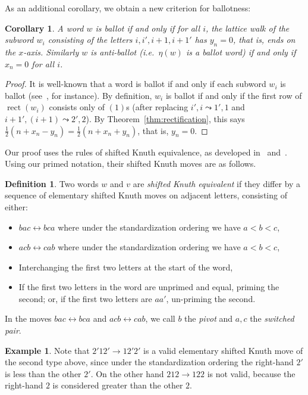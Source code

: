 \documentclass[10pt]{amsart}
\newtheorem{coro}[theorem]{Corollary}
\theoremstyle{definition}
\newtheorem{defi}[theorem]{Definition}
\newtheorem{exam}[theorem]{Example}
\providecommand{\ie}{i.e.\ }
\DeclareMathOperator{\rectify}{rect}
\begin{document}
As an additional corollary, we obtain a new criterion for ballotness:

\begin{coro} \label{cor:ballot-walk-criterion}
A word $w$ is ballot if and only if for all $i$, the lattice walk of the subword $w_i$ consisting of the letters $i,i',i+1,i+1'$ has $y_n = 0$, that is, ends on the $x$-axis. Similarly $w$ is anti-ballot \textup{(}\ie $\eta(w)$ is a ballot word\textup{)} if and only if $x_n = 0$ for all $i$.
\end{coro}

\begin{proof}
It is well-known that a word is ballot if and only if each subword $w_i$ is ballot (see~\cite{Stembridge}, for instance). By definition, $w_i$ is ballot if and only if the first row of $\rectify(w_i)$ consists only of $(1)$s (after replacing $i',i \leadsto 1',1$ and $i+1',(i+1) \leadsto 2',2$). By Theorem~\ref{thm:rectification}, this says $\tfrac{1}{2}(n+x_n-y_n) = \tfrac{1}{2}(n+x_n+y_n)$, that is, $y_n=0$.
\end{proof}


Our proof uses the rules of shifted Knuth equivalence, as developed in~\cite{Sagan} and~\cite{Worley}. Using our primed notation, their shifted Knuth moves are as follows.

\begin{defi}
Two words $w$ and $v$ are \emph{shifted Knuth equivalent} if they differ by a sequence of elementary shifted Knuth moves on adjacent letters, consisting of either:
\begin{itemize}
\item $bac\leftrightarrow bca$ where under the standardization ordering we have $a<b<c$,
\item $acb\leftrightarrow cab$ where under the standardization ordering we have $a<b<c$,
\item Interchanging the first two letters at the start of the word,
\item If the first two letters in the word are unprimed and equal, priming the second; or, if the first two letters are $aa'$, un-priming the second.
\end{itemize}
In the moves $bac \leftrightarrow bca$ and $acb \leftrightarrow cab$, we call $b$ the \emph{pivot} and $a,c$ the \emph{switched pair}.
\end{defi}

\begin{exam}
Note that $2'12'\to 12'2'$ is a valid elementary shifted Knuth move of the second type above, since under the standardization ordering the right-hand $2'$ is less than the other $2'$. On the other hand $212\to 122$ is not valid, because the right-hand $2$ is considered greater than the other $2$.
\end{exam}
\end{document}
